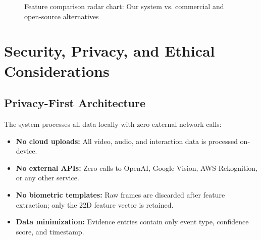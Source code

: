 \documentclass{article}
\begin{document}
\begin{figure}[H]
    \centering
    \caption{Feature comparison radar chart: Our system vs. commercial and open-source alternatives}
    \label{fig:radar}
\end{figure}

\section{Security, Privacy, and Ethical Considerations}
\label{sec:security}

\subsection{Privacy-First Architecture}

The system processes all data locally with zero external network calls:

\begin{itemize}
    \item \textbf{No cloud uploads:} All video, audio, and interaction data is processed on-device.
    \item \textbf{No external APIs:} Zero calls to OpenAI, Google Vision, AWS Rekognition, or any other service.
    \item \textbf{No biometric templates:} Raw frames are discarded after feature extraction; only the 22D feature vector is retained.
    \item \textbf{Data minimization:} Evidence entries contain only event type, confidence score, and timestamp.
\end{itemize}
\end{document}
